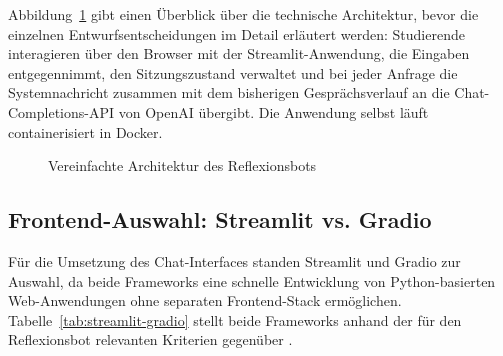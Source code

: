 Abbildung~\ref{fig:architektur} gibt einen Überblick über die technische Architektur, bevor die
einzelnen Entwurfsentscheidungen im Detail erläutert werden: Studierende interagieren über den
Browser mit der Streamlit-Anwendung, die Eingaben entgegennimmt, den Sitzungszustand verwaltet und
bei jeder Anfrage die Systemnachricht zusammen mit dem bisherigen Gesprächsverlauf an die
Chat-Completions-API von OpenAI übergibt. Die Anwendung selbst läuft containerisiert in Docker.

\begin{figure}[htbp]
\centering
{}
\caption{Vereinfachte Architektur des Reflexionsbots}
\label{fig:architektur}
\end{figure}

\subsection{Frontend-Auswahl: Streamlit vs. Gradio}
Für die Umsetzung des Chat-Interfaces standen Streamlit \cite{streamlitSessionState2024} und
Gradio \cite{gradioChatInterface2024} zur Auswahl, da beide Frameworks eine schnelle Entwicklung
von Python-basierten Web-Anwendungen ohne separaten Frontend-Stack ermöglichen.
Tabelle~\ref{tab:streamlit-gradio} stellt beide Frameworks anhand der für den Reflexionsbot
relevanten Kriterien gegenüber \cite{streamlitSessionState2024, gradioChatInterface2024}.

